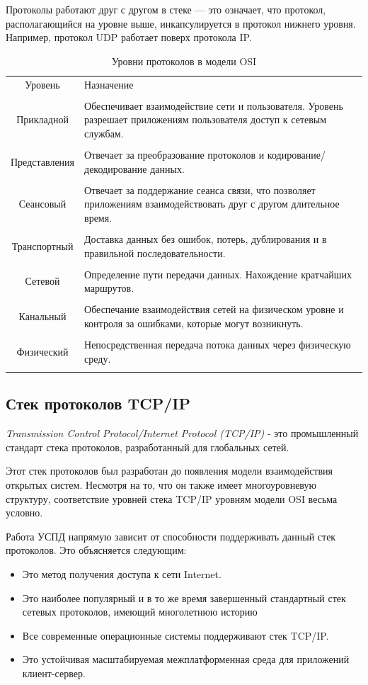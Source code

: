 Протоколы работают друг с другом в стеке --- это означает, что протокол, располагающийся на уровне выше, инкапсулируется в протокол нижнего уровня. Например, протокол UDP работает поверх протокола IP.

\begin{table}[h!]
\caption{Уровни протоколов в модели OSI}
\label{osi}
	\begin{tabular}{|c| >{\centering} m{120mm} <{\centering}|}
	\hline
	Уровень & Назначение \\
	\tabularnewline
	\hline
	Прикладной & Обеспечивает взаимодействие сети и пользователя. Уровень разрешает приложениям пользователя доступ к сетевым службам.\\
	\tabularnewline
	\hline
	Представления & Отвечает за преобразование протоколов и кодирование/декодирование данных.\\
	\tabularnewline
	\hline	
	Сеансовый & Отвечает за поддержание сеанса связи, что позволяет приложениям взаимодействовать друг с другом длительное время.\\
	\tabularnewline
	\hline
	Транспортный & Доставка данных без ошибок, потерь, дублирования и в правильной последовательности.\\
	\tabularnewline
	\hline
	Сетевой & Определение пути передачи данных. Нахождение кратчайших маршрутов.\\
	\tabularnewline
	\hline
	Канальный & Обеспечание взаимодействия сетей на физическом уровне и контроля за ошибками, которые могут возникнуть.\\
	\tabularnewline
	\hline
	Физический & Непосредственная передача потока данных через физическую среду.\\
	\tabularnewline
	\hline 
	\end{tabular}
\end{table}

\subsection{Стек протоколов TCP/IP}

\textit{Transmission Control Protocol/Internet Protocol (TCP/IP)} - это промышленный стандарт стека протоколов, разработанный для глобальных сетей\cite{tcpip}.

Этот стек протоколов был разработан до появления модели взаимодействия открытых систем. Несмотря на то, что он также имеет многоуровневую структуру, соответствие уровней стека TCP/IP уровням модели OSI весьма условно.

Работа УСПД напрямую зависит от способности поддерживать данный стек протоколов\label{reasonofwork}. Это объясняется следующим:
\begin{itemize}
\item Это метод получения доступа к сети Internet.
\item Это наиболее популярный и в то же время завершенный стандартный стек сетевых протоколов, имеющий многолетнюю историю
\item Все современные операционные системы поддерживают стек TCP/IP. 
\item Это устойчивая масштабируемая межплатформенная среда для приложений клиент-сервер.
\end{itemize}

